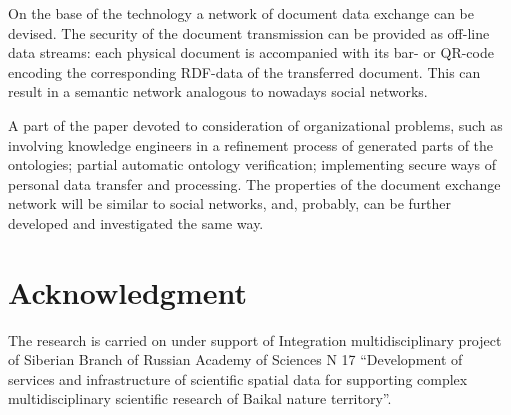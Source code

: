 \documentclass[conference]{IEEEtran}
\begin{document}
On the base of the technology a network of document data exchange can be devised. The security of the document transmission can be provided as off-line data streams: each physical document is accompanied with its bar- or QR-code encoding the corresponding RDF-data of the transferred document. This can result in a semantic network analogous to nowadays social networks.

A part of the paper devoted to consideration of organizational problems, such as involving knowledge engineers in a refinement process of generated parts of the ontologies; partial automatic ontology verification; implementing secure ways of personal data transfer and processing. The properties of the document exchange network will be similar to social networks, and, probably, can be further developed and investigated the same way.





\section*{Acknowledgment}
The research is carried on under support of Integration multidisciplinary project of Siberian Branch of Russian Academy of Sciences N 17 “Development of services and infrastructure of scientific spatial data for supporting complex multidisciplinary scientific research of Baikal nature territory”.







\end{document}
